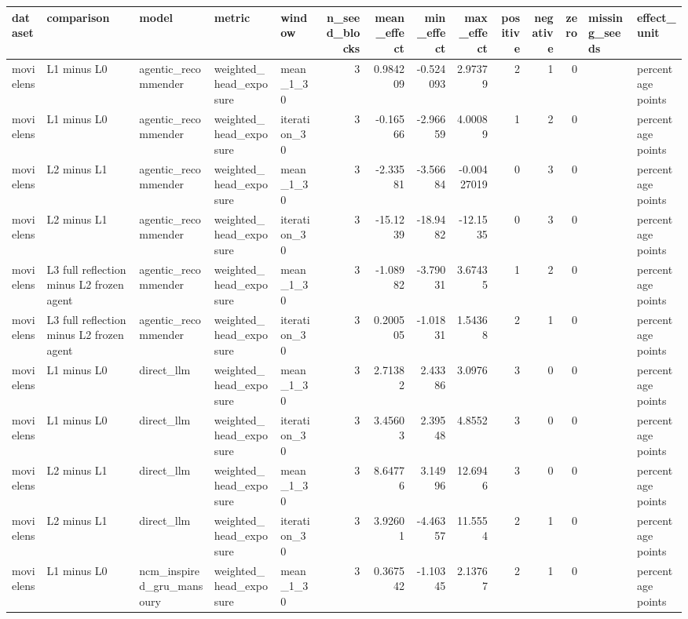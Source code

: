 \begin{table}[htbp!]
\centering
\small
\setlength{\tabcolsep}{3pt}
\renewcommand{\arraystretch}{1.1}
\begin{tabular}{lllllrrrrrrrll}
\hline
dataset & comparison & model & metric & window & n\_seed\_blocks & mean\_effect & min\_effect & max\_effect & positive & negative & zero & missing\_seeds & effect\_unit \\
\hline
movielens & L1 minus L0 & agentic\_recommender & weighted\_head\_exposure & mean\_1\_30 & 3 & 0.984209 & -0.524093 & 2.97379 & 2 & 1 & 0 &  & percentage points \\
movielens & L1 minus L0 & agentic\_recommender & weighted\_head\_exposure & iteration\_30 & 3 & -0.16566 & -2.96659 & 4.00089 & 1 & 2 & 0 &  & percentage points \\
movielens & L2 minus L1 & agentic\_recommender & weighted\_head\_exposure & mean\_1\_30 & 3 & -2.33581 & -3.56684 & -0.00427019 & 0 & 3 & 0 &  & percentage points \\
movielens & L2 minus L1 & agentic\_recommender & weighted\_head\_exposure & iteration\_30 & 3 & -15.1239 & -18.9482 & -12.1535 & 0 & 3 & 0 &  & percentage points \\
movielens & L3 full reflection minus L2 frozen agent & agentic\_recommender & weighted\_head\_exposure & mean\_1\_30 & 3 & -1.08982 & -3.79031 & 3.67435 & 1 & 2 & 0 &  & percentage points \\
movielens & L3 full reflection minus L2 frozen agent & agentic\_recommender & weighted\_head\_exposure & iteration\_30 & 3 & 0.200505 & -1.01831 & 1.54368 & 2 & 1 & 0 &  & percentage points \\
movielens & L1 minus L0 & direct\_llm & weighted\_head\_exposure & mean\_1\_30 & 3 & 2.71382 & 2.43386 & 3.0976 & 3 & 0 & 0 &  & percentage points \\
movielens & L1 minus L0 & direct\_llm & weighted\_head\_exposure & iteration\_30 & 3 & 3.45603 & 2.39548 & 4.8552 & 3 & 0 & 0 &  & percentage points \\
movielens & L2 minus L1 & direct\_llm & weighted\_head\_exposure & mean\_1\_30 & 3 & 8.64776 & 3.14996 & 12.6946 & 3 & 0 & 0 &  & percentage points \\
movielens & L2 minus L1 & direct\_llm & weighted\_head\_exposure & iteration\_30 & 3 & 3.92601 & -4.46357 & 11.5554 & 2 & 1 & 0 &  & percentage points \\
movielens & L1 minus L0 & ncm\_inspired\_gru\_mansoury & weighted\_head\_exposure & mean\_1\_30 & 3 & 0.367542 & -1.10345 & 2.13767 & 2 & 1 & 0 &  & percentage points \\

\end{tabular}
\end{table}
